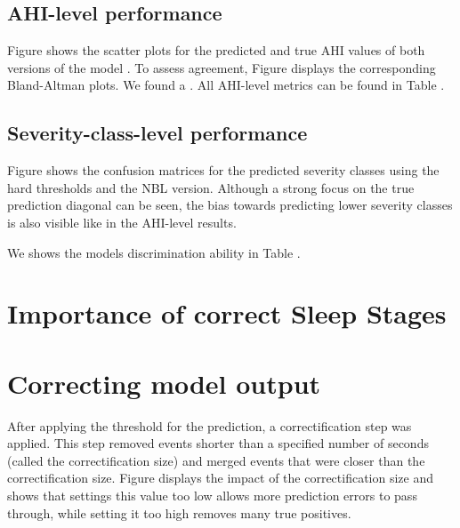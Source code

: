 \subsection*{AHI-level performance}

Figure  shows the scatter plots for the predicted and true AHI values of both versions of the model . To assess agreement, Figure  displays the corresponding Bland-Altman plots. We found a . All AHI-level metrics can be found in Table .

\subsection*{Severity-class-level performance}

Figure  shows the confusion matrices for the predicted severity classes using the hard thresholds and the NBL version. Although a strong focus on the true prediction diagonal can be seen, the bias towards predicting lower severity classes is also visible like in the AHI-level results.

We shows the models discrimination ability in Table . 

\section{Importance of correct Sleep Stages}


\section{Correcting model output}

After applying the threshold for the prediction, a correctification step was applied. This step removed events shorter than a specified number of seconds (called the correctification size) and merged events that were closer than the correctification size. Figure  displays the impact of the correctification size and shows that settings this value too low allows more prediction errors to pass through, while setting it too high removes many true positives.

